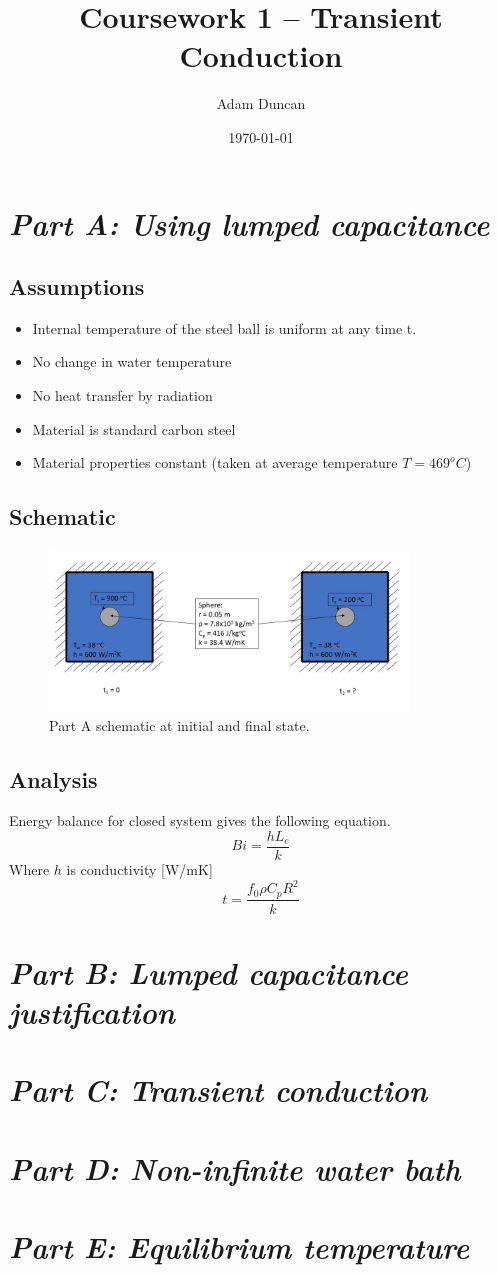 \documentclass[11pt]{article}
\title{Coursework 1 – Transient Conduction}
\author{Adam Duncan}
\date{\today}
\begin{document}
\maketitle

\section{\emph{Part A: Using lumped capacitance}}
\subsection{Assumptions}
\begin{itemize}
	\item Internal temperature of the steel ball is uniform at any time t.
	\item No change in water temperature
	\item No heat transfer by radiation
	\item Material is standard carbon steel
	\item Material properties constant (taken at average temperature $T = 469 ^{o}C$)
\end{itemize}
\subsection{Schematic}
\begin{figure}[h]
	\centering
	\includegraphics[width=0.85\textwidth]{part_a_fig}
	\caption{Part A schematic at initial and final state.}
	\label{fig:schem_a}
\end{figure}
\subsection{Analysis}
Energy balance for closed system gives the following equation.
\begin{equation}
	Bi = \frac{h L_{c}}{k}
\end{equation}
Where $h$ is conductivity [W/mK]
\begin{equation}
	t=\frac{f_{0} \rho C_{p} R^{2}}{k}
\end{equation}
\section{\emph{Part B: Lumped capacitance justification}}

\section{\emph{Part C: Transient conduction}}

\section{\emph{Part D: Non-infinite water bath}}

\section{\emph{Part E: Equilibrium temperature}}
\end{document}
